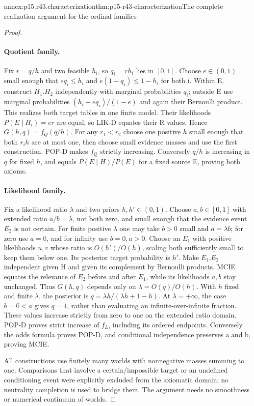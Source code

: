 \begin{annexitem}{annex:p15.r43.characterization}{thm:p15-r43-characterization}{The complete realization argument for the ordinal families}
\begin{proof}
\paragraph{Quotient family.}
Fix \(r=q/h\) and two feasible \(h_i\), so \(q_i=rh_i\) lies in \([0,1]\).
Choose \(e\in(0,1)\) small enough that
\(e q_i\leq h_i\) and \(e(1-q_i)\leq1-h_i\) for both i.
Within E, construct \(H_1\),\(H_2\) independently with marginal probabilities
\(q_i\); outside E use marginal probabilities
\((h_i-eq_i)/(1-e)\) and again their Bernoulli product.
This realizes both target tables in one finite model.
Their likelihoods \(P(E\mid H_i)=er\) are equal, so LIK-D equates
their R values. Hence \(G(h,q)=f_Q(q/h)\).
For any \(r_1<r_2\) choose one positive \(h\) small enough that both
\(r_i h\) are at most one, then choose small evidence masses and use
the first construction. POP-D makes \(f_Q\) strictly increasing.
Conversely \(q/h\) is increasing in \(q\) for fixed \(h\), and equals
\(P(E\mid H)/P(E)\) for a fixed source E, proving both axioms.

\paragraph{Likelihood family.}
Fix a likelihood ratio \(\lambda\) and two priors \(h,h'\in(0,1)\).
Choose \(a,b\in[0,1]\) with extended ratio \(a/b=\lambda\), not both zero, and small
enough that the evidence event \(E_2\) is not certain. For finite positive
\(\lambda\) one may take \(b>0\) small and \(a=\lambda b\); for zero use \(a=0\),
and for infinity use \(b=0,a>0\). Choose an \(E_1\) with positive
likelihoods \(u,v\) whose ratio is \(O(h')/O(h)\), scaling both sufficiently
small to keep them below one. Its posterior target probability is \(h'\).
Make \(E_1\),\(E_2\) independent given H and given its complement by
Bernoulli products. MCIE equates the relevance of \(E_2\) before and
after \(E_1\), while its likelihoods \(a,b\) stay unchanged. Thus \(G(h,q)\)
depends only on \(\lambda=O(q)/O(h)\). With \(h\) fixed and finite
\(\lambda\), the posterior is \(q=\lambda h/(\lambda h+1-h)\).
At \(\lambda=+\infty\), the case \(b=0<a\) gives \(q=1\),
rather than evaluating an infinite-over-infinite fraction. These values
increase strictly from zero to one on the extended ratio domain.
POP-D proves strict increase of \(f_L\), including its ordered endpoints.
Conversely the odds formula proves
POP-D, and conditional independence preserves a and b, proving MCIE.

All constructions use finitely many worlds with nonnegative masses
summing to one. Comparisons that involve a certain/impossible target
or an undefined conditioning event were explicitly excluded from the
axiomatic domain; no neutrality completion is used to bridge them.
The argument needs no smoothness or numerical continuum of worlds.
\end{proof}
\end{annexitem}

